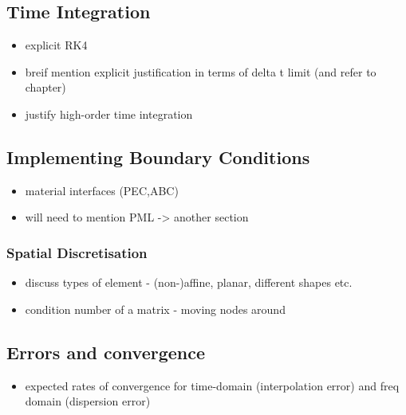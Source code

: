 \subsection{Time Integration}
\begin{itemize}
	\item explicit RK4
	\item breif mention explicit justification in terms of delta t limit (and refer to chapter)
	\item justify high-order time integration
\end{itemize}

\subsection{Implementing Boundary Conditions}
\begin{itemize}
	\item material interfaces (PEC,ABC)
  \item will need to mention PML -> another section
\end{itemize}
\subsubsection{Spatial Discretisation}
\begin{itemize}
	\item discuss types of element - (non-)affine, planar, different shapes etc.
	\item condition number of a matrix - moving nodes around %
\end{itemize}
\subsection{Errors and convergence}
\begin{itemize}
  \item expected rates of convergence for time-domain (interpolation error) and freq domain (dispersion error)
\end{itemize}